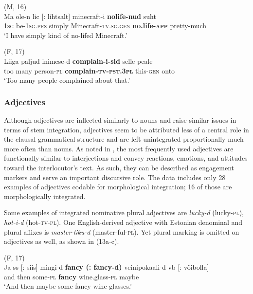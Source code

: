 \documentclass[output=paper]{langscibook}
\begin{document}
\ea%
    \label{ex:vihmanetal:12}
\ea  (M, 16)\\  \label{ex:vihmanetal:12a}
\gll Ma  ole-n    {lic [: lihtsalt]}  minecraft-i \textbf{{nolife-nud}}   suht
\\
1\textsc{sg}   be{}-1\textsc{sg.prs}   simply     Minecraft{}-\textsc{tv.sg.gen} \textbf{no.life{}-}\textbf{\textsc{app}}   pretty-much\\
\glt ‘I have simply kind of no-lifed Minecraft.’

\ex  (F, 17)\\  \label{ex:vihmanetal:12b}
\gll Liiga   paljud   inimese-d \textbf{{complain-i-sid}} selle peale\\
too   many   person{}-\textsc{pl}   \textbf{complain-\textsc{tv-pst}}\textbf{.3\textsc{pl}}  this\textsc{{}-gen} onto\\
\glt ‘Too many people complained about that.’
    \z
\z



\subsubsection{Adjectives}

Although adjectives are inflected similarly to nouns and raise similar issues in terms of stem integration, adjectives seem to be attributed less of a central role in the clausal grammatical structure and are left unintegrated proportionally much more often than nouns. As noted in , the most frequently used adjectives are functionally similar to interjections and convey reactions, emotions, and attitudes toward the interlocutor’s text. As such, they can be described as engagement markers and serve an important discursive role. The data includes only 28 examples of adjectives codable for morphological integration; 16 of those are morphologically integrated.

Some examples of integrated nominative plural adjectives are \textit{lucky-d} (lucky-\textsc{pl}), \textit{hot-i-d} (hot-\textsc{tv-pl}). One English-derived adjective with Estonian denominal and plural affixes is \textit{master-liku-d} (master-ful-\textsc{pl}). Yet plural marking is omitted on adjectives as well, as shown in (13a-c).

\ea%
    \label{ex:vihmanetal:13}
\ea  (F, 17)\\\label{ex:vihmanetal:13a}
\gll Ja   {ss [{: siis}]} mingi-d   \textbf{{fancy} \textbf{(:} \textbf{fancy-d)}} veinipokaali-d     {vb [{: võibolla}]}\\
and  then       some{}-\textsc{pl}   \textbf{fancy} wine.glass{}-\textsc{pl}     maybe\\
\glt  ‘And then maybe some fancy wine glasses.’
\end{document}
